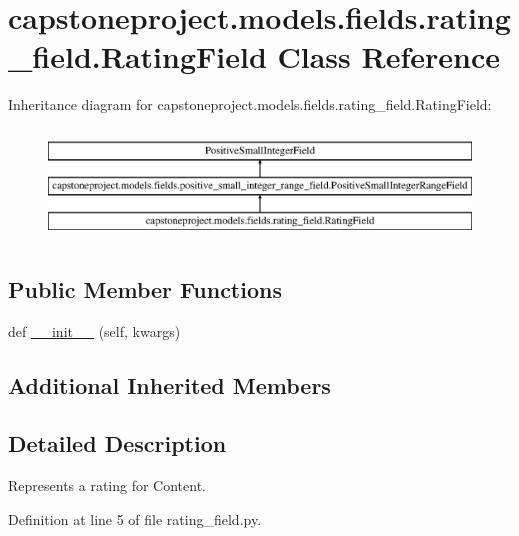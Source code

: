 \hypertarget{classcapstoneproject_1_1models_1_1fields_1_1rating__field_1_1_rating_field}{}\section{capstoneproject.\+models.\+fields.\+rating\+\_\+field.\+Rating\+Field Class Reference}
\label{classcapstoneproject_1_1models_1_1fields_1_1rating__field_1_1_rating_field}
Inheritance diagram for capstoneproject.\+models.\+fields.\+rating\+\_\+field.\+Rating\+Field\+:\begin{figure}[H]
\begin{center}
\leavevmode
\includegraphics[height=2.962963cm]{classcapstoneproject_1_1models_1_1fields_1_1rating__field_1_1_rating_field}
\end{center}
\end{figure}
\subsection*{Public Member Functions}
\begin{DoxyCompactItemize}
\item 
def \mbox{\hyperlink{classcapstoneproject_1_1models_1_1fields_1_1rating__field_1_1_rating_field_a50e1b73b2e646ba737f5619e68a4bc06}{\+\_\+\+\_\+init\+\_\+\+\_\+}} (self, kwargs)
\end{DoxyCompactItemize}
\subsection*{Additional Inherited Members}


\subsection{Detailed Description}
\begin{DoxyVerb}Represents a rating for Content.\end{DoxyVerb}
 

Definition at line 5 of file rating\+\_\+field.\+py.




